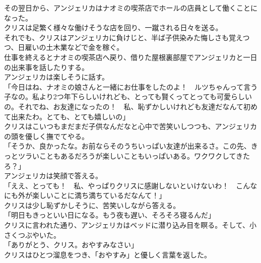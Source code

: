 \documentclass[b5j,10pt,openany]{jsbook}
\begin{document}
その翌日から、アンジェリカはナオミの喫茶店でホールの店員として働くことになった。\\クリスは足繁く様々な働けそうな店を回り、一蹴される日々を送る。\\それでも、クリスはアンジェリカに負けじと、半ば子供染みた悔しさも覚えつつ、日雇いの土木業などで金を稼ぐ。\\仕事を終えるとナオミの喫茶店へ戻り、借りた屋根裏部屋でアンジェリカと一日の出来事を話したりする。\\アンジェリカは楽しそうに話す。\\「今日はね、ナオミの娘さんと一緒にお仕事をしたのよ！　ルツちゃんって言う子なの。私より2つ年下らしいけれども、とっても賢くってとっても可愛らしいの。それでね、お友達になったの！　私、恥ずかしいけれども友達だなんて初めて出来たわ。とても、とても嬉しいの」\\クリスはこいつもまだまだ子供なんだなと心中で苦笑いしつつも、アンジェリカの頭を優しく撫でてやる。\\「そうか、良かったな。お前ならそのうちいっぱい友達が出来るさ。この先、きっとツラいこともあるだろうが楽しいこともいっぱいある。ワクワクしてきたろ？」\\アンジェリカは笑顔で答える。\\「ええ、とっても！　私、やっぱりクリスに感謝しないといけないわ！　こんなにも外が楽しいことに満ち満ちているだなんて！」\\クリスは少し恥ずかしそうに、苦笑いしながら答える。\\「明日もきっといい日になる。もう夜も遅い、そろそろ寝るんだ」\\クリスに言われた通り、アンジェリカはベッドに潜り込み目を瞑る。そして、小さくつぶやいた。\\「ありがとう、クリス。おやすみなさい」\\クリスはひとつ溜息をつき、「おやすみ」と優しく言葉を返した。
\end{document}
